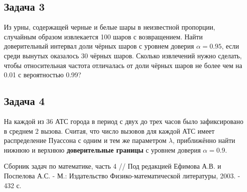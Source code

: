\documentclass[a4paper,12pt]{article}
\begin{document}
\subsection*{Задача 3 \cite[187]{Efimov}}

Из урны, содержащей черные и белые шары в неизвестной пропорции, случайным образом извлекается 100 шаров с возвращением. Найти доверительный интервал
доли чёрных шаров с уровнем доверия $\alpha=0.95$, если среди вынутых оказалось 30 чёрных шаров. Сколько извлечений нужно сделать, чтобы относительная
частота отличалась от доли чёрных шаров не более чем на 0.01 с вероятностью 0.99?

\subsection*{Задача 4 \cite[191]{Efimov}}

На каждой из 36 АТС города в период с двух до трех часов было зафиксировано в среднем 2 вызова. Считая, что число вызовов для каждой АТС имеет
распределение Пуассона с одним и тем же параметром $\lambda$, приближённо найти нижнюю и верхнюю \textbf{доверительные границы} с уровнем
доверия $\alpha = 0.9$.

\begin{thebibliography}{1}
     Сборник задач по математике, часть 4 // Под редакцией Ефимова А.В. и Поспелова А.С. - М.: Издательство Физико-математической
    литературы, 2003. - 432 с.
\end{thebibliography}
\end{document}
